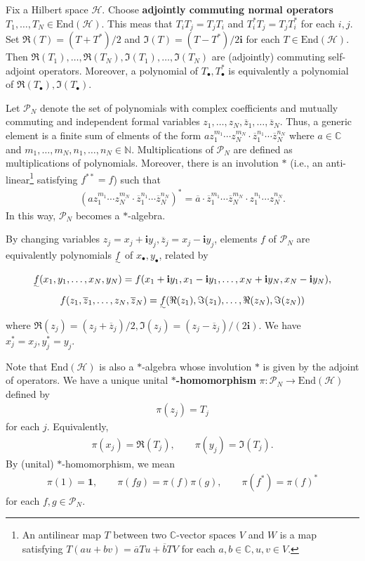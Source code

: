 \documentclass[12pt,b5paper,notitlepage]{article}
\theoremstyle{definition}
\theoremstyle{plain}
\newcommand{\mc}{\mathcal}
\newcommand{\ovl}{\overline}
\newcommand{\End}{\mathrm{End}} %
\newcommand{\idt}{\mathbf{1}}
\newcommand{\im}{\mathbf{i}}
\newcommand{\blt}{\bullet}
\newcommand{\Cbb}{\mathbb C}
\newcommand{\Nbb}{\mathbb N}
\numberwithin{equation}{section}
\begin{document}
Fix a Hilbert space $\mc H$. Choose \textbf{adjointly commuting normal operators} $T_1,\dots,T_N\in\End(\mc H)$. This meas that  $T_iT_j=T_jT_i$ and $T_i^*T_j=T_jT_i^*$ for each $i,j$.   Set $\Re(T)=(T+T^*)/2$ and $\Im (T)=(T-T^*)/{2\im}$ for each $T\in\End(\mc H)$. Then $\Re (T_1),\dots,\Re (T_N),\Im (T_1),\dots,\Im (T_N)$ are (adjointly) commuting self-adjoint operators. Moreover, a polynomial of $T_\blt,T^*_\blt$ is equivalently a polynomial of $\Re (T_\blt),\Im (T_\blt)$.

Let $\mc P_N$ \index{PN@$\mc P_N$} denote the set of polynomials with complex coefficients and mutually commuting and independent formal variables $z_1,\dots,z_N,\ovl z_1,\dots,\ovl z_N$. Thus, a generic element is a finite sum of elments of the form $az_1^{m_1}\cdots z_N^{m_N}\cdot \ovl z_1^{n_1}\cdots \ovl z_N^{n_N}$ where $a\in\Cbb$ and $m_1,\dots,m_N,n_1,\dots,n_N\in \Nbb$. Multiplications of $\mc P_N$ are defined as multiplications of polynomials. Moreover, there is an involution $*$ (i.e., an anti-linear\footnote{An antilinear map $T$ between two $\Cbb$-vector spaces $V$ and $W$ is a map satisfying $T(au+bv)=\ovl a Tu+\ovl b TV$ for each $a,b\in\Cbb,u,v\in V$.} satisfying $f^{**}=f$) such that
\begin{align*}
(az_1^{m_1}\cdots z_N^{m_N}\cdot \ovl z_1^{n_1}\cdots \ovl z_N^{n_N})^*=\ovl a\cdot \ovl z_1^{m_1}\cdots \ovl z_N^{m_N}\cdot z_1^{n_1}\cdots z_N^{n_N}.	
\end{align*}
In this way, $\mc P_N$ becomes a $*$-algebra.

By changing variables $z_j=x_j+\im y_j,\ovl z_j=x_j-\im y_j$, elements $f$ of $\mc P_N$ are equivalently polynomials $\uwave f$  of $x_\blt,y_\blt$, related by
\begin{gather*}
\uwave f(x_1,y_1,\dots,x_N,y_N)=f(x_1+\im y_1,x_1-\im y_1,\dots,x_N+\im y_N,x_N-\im y_N),	\\
f(z_1,\ovl z_1,\dots,z_N,\ovl z_N)=\uwave f(\Re(z_1),\Im(z_1),\dots,\Re(z_N),\Im(z_N))	
\end{gather*}
where $\Re(z_j)=(z_j+\ovl z_j)/2,\Im(z_j)=(z_j-\ovl z_j)/(2\im)$. We have $x_j^*=x_j,y_j^*=y_j$. %


Note that $\End(\mc H)$ is also a $*$-algebra whose involution $*$ is given by the adjoint of operators. We have a unique unital \textbf{$*$-homomorphism} $\pi:\mc P_N\rightarrow\End(\mc H)$ defined by
\begin{align}
\pi(z_j)=T_j \label{eq1}
\end{align}
for each $j$. Equivalently,
\begin{align*}
\pi (x_j)=\Re(T_j),\qquad \pi(y_j)=\Im(T_j).	
\end{align*}
By (unital) $*$-homomorphism, we mean
\begin{gather}
\pi(1)=\idt,\qquad 	\pi(fg)=\pi(f)\pi(g),\qquad \pi(f^*)=\pi(f)^*\label{eq15}
\end{gather}
for each $f,g\in\mc P_N$. 
\end{document}
